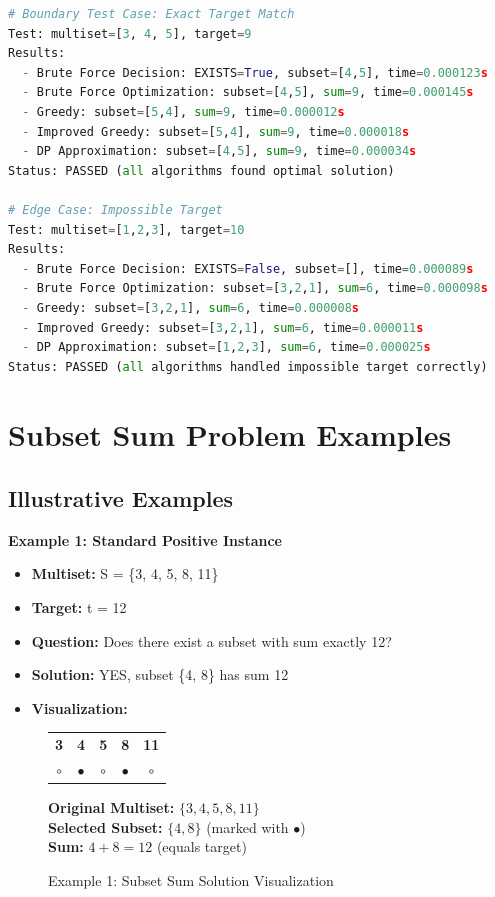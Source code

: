 \documentclass[12pt,a4paper]{article}
\begin{document}
\begin{lstlisting}[language=Python, caption=Sample Functional Test Results]
# Boundary Test Case: Exact Target Match
Test: multiset=[3, 4, 5], target=9
Results:
  - Brute Force Decision: EXISTS=True, subset=[4,5], time=0.000123s
  - Brute Force Optimization: subset=[4,5], sum=9, time=0.000145s
  - Greedy: subset=[5,4], sum=9, time=0.000012s
  - Improved Greedy: subset=[5,4], sum=9, time=0.000018s
  - DP Approximation: subset=[4,5], sum=9, time=0.000034s
Status: PASSED (all algorithms found optimal solution)

# Edge Case: Impossible Target
Test: multiset=[1,2,3], target=10
Results:
  - Brute Force Decision: EXISTS=False, subset=[], time=0.000089s
  - Brute Force Optimization: subset=[3,2,1], sum=6, time=0.000098s
  - Greedy: subset=[3,2,1], sum=6, time=0.000008s
  - Improved Greedy: subset=[3,2,1], sum=6, time=0.000011s
  - DP Approximation: subset=[1,2,3], sum=6, time=0.000025s
Status: PASSED (all algorithms handled impossible target correctly)
\end{lstlisting}

\section{Subset Sum Problem Examples}

\subsection{Illustrative Examples}

\textbf{Example 1: Standard Positive Instance}
\begin{itemize}
\item \textbf{Multiset:} S = \{3, 4, 5, 8, 11\}
\item \textbf{Target:} t = 12
\item \textbf{Question:} Does there exist a subset with sum exactly 12?
\item \textbf{Solution:} YES, subset \{4, 8\} has sum 12
\item \textbf{Visualization:}
\end{itemize}

\begin{figure}[H]
\centering
\begin{tabular}{ccccc}
\textbf{3} & \textbf{4} & \textbf{5} & \textbf{8} & \textbf{11} \\
$\circ$ & $\bullet$ & $\circ$ & $\bullet$ & $\circ$ \\
\end{tabular}
\vspace{0.5cm}

\textbf{Original Multiset:} $\{3, 4, 5, 8, 11\}$ \\
\textbf{Selected Subset:} $\{4, 8\}$ (marked with $\bullet$) \\
\textbf{Sum:} $4 + 8 = 12$ (equals target)
\caption{Example 1: Subset Sum Solution Visualization}
\end{figure}
\end{document}

